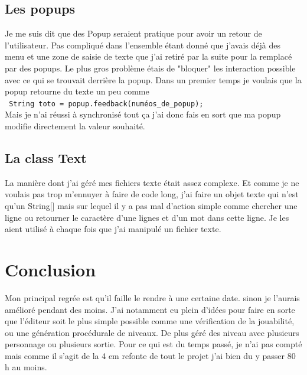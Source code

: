 \documentclass[10pt,a4paper]{article}
\begin{document}
\subsection{Les popups}
Je me suis dit que des Popup seraient pratique pour avoir un retour de l'utilisateur. Pas compliqué dans l'ensemble étant donné que j'avais déjà des menu et une zone de saisie de texte que j'ai retiré par la suite pour la remplacé par des popups. Le plus gros problème étais de "bloquer" les interaction possible avec ce qui se trouvait derrière la popup. Dans un premier temps je voulais que la popup retourne du texte un peu comme \\
\verb| String toto = popup.feedback(numéos_de_popup);| \\
Mais je n'ai réussi à synchronisé tout ça j'ai donc fais en sort que ma popup modifie directement la valeur souhaité. 
\subsection{La class Text}
La manière dont j'ai géré mes fichiers texte était assez complexe. Et comme je ne voulais pas trop m'ennuyer à faire de code long, j'ai faire un objet texte qui n'est qu'un String[] mais sur lequel il y a pas mal d'action simple comme chercher une ligne ou retourner le caractère d'une lignes et d'un mot dans cette ligne. Je les aient utilisé à chaque fois que j'ai manipulé un fichier texte. 
\section{Conclusion}
Mon principal regrée est qu'il faille le rendre à une certaine date. sinon je l'aurais amélioré pendant des moins. J'ai notamment eu plein d'idées pour faire en sorte que l'éditeur soit le plus simple possible comme une vérification de la jouabilité, ou une génération procédurale de niveaux. De plus géré des niveau avec plusieurs personnage ou plusieurs sortie. Pour ce qui est du temps passé, je n'ai pas compté mais comme il s'agit de la 4 em refonte de tout le projet j'ai bien du y passer 80 h au moins. 
\end{document}
